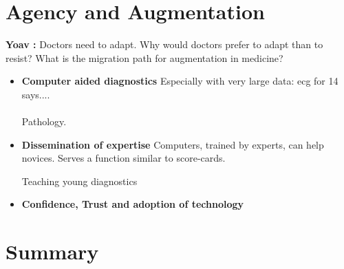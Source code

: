 \documentclass[10pt]{article}
\newcommand{\comment}[3]{{\color{#1} {\bf #2 :} #3}}
\newcommand{\yoav}[1]{\comment{red}{Yoav}{#1}}
\begin{document}
\section*{Agency and Augmentation}
\yoav{Doctors need to adapt. Why would doctors prefer to adapt than to
  resist? What is the migration path for augmentation in medicine?}
\begin{itemize}
\item{\bf Computer aided diagnostics}
  Especially with very large data: ecg for 14 says.... \\
  ~\\

Pathology.

\item {\bf Dissemination of expertise}
Computers, trained by experts, can help novices.  Serves a function
similar to score-cards.

Teaching young diagnostics
\item { \bf Confidence, Trust and adoption of technology}
\end{itemize}

\section*{Summary}

 


\end{document}
